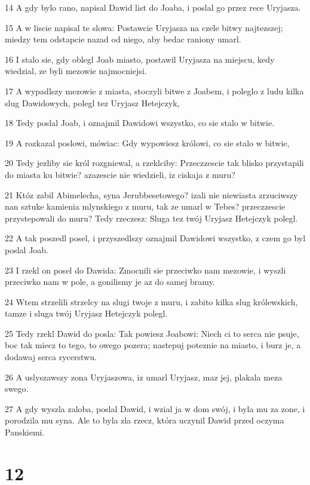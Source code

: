 \par 14 A gdy bylo rano, napisal Dawid list do Joaba, i poslal go przez rece Uryjasza.
\par 15 A w liscie napisal te slowa: Postawcie Uryjasza na czele bitwy najtezszej; miedzy tem odstapcie nazad od niego, aby bedac raniony umarl.
\par 16 I stalo sie, gdy oblegl Joab miasto, postawil Uryjasza na miejscu, kedy wiedzial, ze byli mezowie najmocniejsi.
\par 17 A wypadlszy mezowie z miasta, stoczyli bitwe z Joabem, i poleglo z ludu kilka slug Dawidowych, polegl tez Uryjasz Hetejczyk,
\par 18 Tedy poslal Joab, i oznajmil Dawidowi wszystko, co sie stalo w bitwie.
\par 19 A rozkazal poslowi, mówiac: Gdy wypowiesz królowi, co sie stalo w bitwie,
\par 20 Tedy jezliby sie król rozgniewal, a rzeklciby: Przeczzescie tak blisko przystapili do miasta ku bitwie? azazescie nie wiedzieli, iz ciskaja z muru?
\par 21 Któz zabil Abimelecha, syna Jerubbesetowego? izali nie niewiasta zrzuciwszy nan sztuke kamienia mlynskiego z muru, tak ze umarl w Tebes? przeczzescie przystepowali do muru? Tedy rzeczesz: Sluga tez twój Uryjasz Hetejczyk polegl.
\par 22 A tak poszedl posel, i przyszedlszy oznajmil Dawidowi wszystko, z czem go byl poslal Joab.
\par 23 I rzekl on posel do Dawida: Zmocnili sie przeciwko nam mezowie, i wyszli przeciwko nam w pole, a gonilismy je az do samej bramy.
\par 24 Wtem strzelili strzelcy na slugi twoje z muru, i zabito kilka slug królewskich, tamze i sluga twój Uryjasz Hetejczyk polegl.
\par 25 Tedy rzekl Dawid do posla: Tak powiesz Joabowi: Niech ci to serca nie psuje, boc tak miecz to tego, to owego pozera; nastepuj poteznie na miasto, i burz je, a dodawaj serca rycerstwu.
\par 26 A uslyszawszy zona Uryjaszowa, iz umarl Uryjasz, maz jej, plakala meza swego.
\par 27 A gdy wyszla zaloba, poslal Dawid, i wzial ja w dom swój, i byla mu za zone, i porodzila mu syna. Ale to byla zla rzecz, która uczynil Dawid przed oczyma Panskiemi.

\chapter{12}


